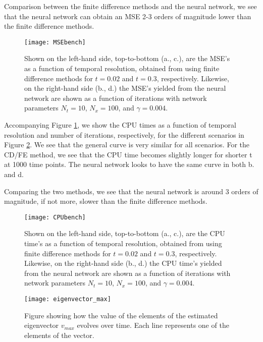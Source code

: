 Comparison between the finite difference methods and the neural network, we see that the neural network can obtain an MSE 2-3 orders of magnitude lower than the finite difference methods.
\begin{figure}[htbp]
 	\centering
 	\texttt{[image: MSEbench]}
  \caption{Shown on the left-hand side, top-to-bottom (a., c.), are the MSE's as a function of temporal resolution, obtained from using finite difference methods for $t=0.02$ and $t=0.3$, respectively. Likewise, on the right-hand side (b., d.) the MSE's yielded from the neural network are shown as a function of iterations with network parameters $N_t = 10$, $N_x = 100$, and $\gamma = 0.004$.}
  \label{fig:MSEbench}
\end{figure}

Accompanying Figure \ref{fig:MSEbench}, we show the CPU times as a function of temporal resolution and number of iterations, respectively, for the different scenarios in Figure \ref{fig:CPUbench}. We see that the general curve is very similar for all scenarios. For the CD/FE method, we see that the CPU time becomes slightly longer for shorter t at 1000 time points. The neural network looks to have the same curve in both b. and d.

Comparing the two methods, we see that the neural network is around 3 orders of magnitude, if not more, slower than the finite difference methods.
\begin{figure}[htbp]
 	\centering
 	\texttt{[image: CPUbench]}
 	\caption{Shown on the left-hand side, top-to-bottom (a., c.), are the CPU time's as a function of temporal resolution, obtained from using finite difference methods for $t=0.02$ and $t=0.3$, respectively. Likewise, on the right-hand side (b., d.) the CPU time's yielded from the neural network are shown as a function of iterations with network parameters $N_t = 10$, $N_x = 100$, and $\gamma = 0.004$.}
  \label{fig:CPUbench}
\end{figure}

\begin{figure}[htbp]
 \centering
 \texttt{[image: eigenvector\_max]}
 \caption{Figure showing how the value of the elements of the estimated eigenvector $v_{max}$ evolves over time. Each line represents one of the elements of the vector.}
 \label{fig:eigenvector_max}
\end{figure}

